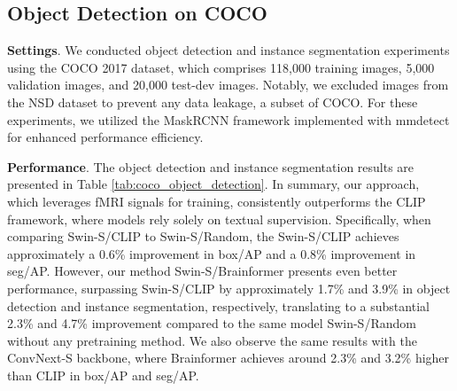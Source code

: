 \subsection{Object Detection on COCO}
\textbf{Settings}. We conducted object detection and instance segmentation experiments using the COCO 2017 dataset, which comprises 118,000 training images, 5,000 validation images, and 20,000 test-dev images. Notably, we excluded images from the NSD dataset to prevent any data leakage, a subset of COCO. For these experiments, we utilized the MaskRCNN framework \cite{maskrcnn} implemented with mmdetect \cite{mmdetection} for enhanced performance efficiency. 

\noindent
\textbf{Performance}. The object detection and instance segmentation results are presented in Table \ref{tab:coco_object_detection}. In summary, our approach, which leverages fMRI signals for training, consistently outperforms the CLIP framework, where models rely solely on textual 
supervision. Specifically, when comparing Swin-S/CLIP to Swin-S/Random, the Swin-S/CLIP achieves approximately a 0.6\% improvement in box/AP and a 0.8\% improvement in seg/AP. However, our method Swin-S/Brainformer presents even better performance, surpassing Swin-S/CLIP by approximately 1.7\% and 3.9\% in object detection and instance segmentation, respectively, translating to a substantial 2.3\% and 4.7\% improvement compared to the same model Swin-S/Random without any pretraining method.
We also observe the same results with the ConvNext-S backbone, where Brainformer achieves around 2.3\% and 3.2\% higher than CLIP in box/AP and seg/AP.


